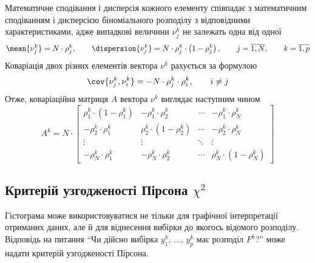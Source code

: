 Математичне сподівання і дисперсія кожного елементу співпадає з математичним
сподіванням і дисперсією біноміального розподілу з відповідними
характеристиками, адже випадкові величини $\nu_j^k$ не залежать одна від одної
\begin{equation*}
  \mean{\nu_j^k} = N \cdot \rho_j^k,\qquad
  \dispersion{\nu_j^k} = N \cdot \rho_j^k \cdot \left( 1 - \rho_j^k \right),
  \qquad j = \overline{1,N},
  \qquad k = \overline{1,p}
\end{equation*}
Коваріація двох різних елементів вектора $\nu^k$ рахується за формулою
\cite{Mukhopadhyay:2000}
\begin{equation*}
  \cov{\nu_j^k, \nu_i^k} = - N \cdot \rho_j^k \cdot \rho_i^k,
  \qquad i \neq j
\end{equation*}
Отже, коваріаційна матриця $A$ вектора $\nu^k$ виглядає наступним чином
\begin{equation*}
  A^k = N \cdot
   \begin{bmatrix}
      \rho_1^k \cdot \left( 1 - \rho_1^k \right) & - \rho_1^k \cdot \rho_2^k
              & \cdots & - \rho_1^k \cdot \rho_N^k \\

      - \rho_2^k \cdot \rho_1^k                  & \rho_2^k \cdot
          \left( 1 - \rho_2^k \right) & \cdots & - \rho_2^k \cdot \rho_N^k \\

      \vdots                                     & \vdots
              & \ddots & \vdots \\

       - \rho_N^k \cdot \rho_1^k                 & - \rho_N^k \cdot \rho_2^k
              & \cdots & \rho_N^k \cdot \left( 1 - \rho_N^k \right)
    \end{bmatrix}
\end{equation*}

\subsection{Критерій узгодженості Пірсона $\chi^2$}
Гістограма може використовуватися не тільки для графічної інтерпретації
отриманих даних, але й для віднесення вибірки до якогось відомого розподілу.
Відповідь на питання ``Чи дійсно вибірка $y_1^k$, $\dots$, $y_p^k$ має розподіл
$F^k$?'' може надати критерій узгодженості Пірсона. %

